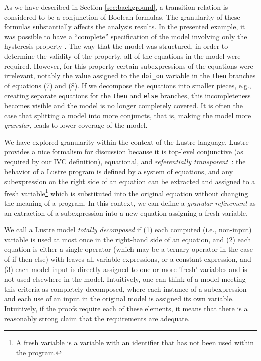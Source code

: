 As we have described in Section \ref{sec:background}, a transition relation is considered
to be a conjunction of Boolean formulas. The granularity of these formulas substantially affects the analysis results.  In the presented example, it was possible to have a ``complete'' specification of the model involving only the hysteresis property \hystp.  The way that the model was structured, in order to determine the validity of the property, all of the equations in the model were required.  However, for this property certain subexpressions of the equations were irrelevant, notably the value assigned to the \texttt{doi\_on} variable in the \texttt{then} branches of equations (7) and (8).  If we decompose the equations into smaller pieces, e.g., creating separate equations for the \texttt{then} and \texttt{else} branches, this incompleteness becomes visible and the model is no longer completely covered.  It is often the case that splitting a model into more conjuncts, that is, making the model more {\em granular}, leads to lower coverage of the model.



%
We have explored granularity within the context of the Lustre language.  Lustre provides a nice formalism for discussion because it is top-level conjunctive (as required by our IVC definition), equational, and {\em referentially transparent}~\cite{Halbwachs91:lustre}: the behavior of a Lustre program is defined by a system of equations, and any subexpression on the right side of an equation can be extracted and assigned to a fresh variable\footnote{A fresh variable is a variable with an identifier that has not been used within the program.} which is substituted into the original equation without changing the meaning of a program.  In this context, we can define a {\em granular refinement} as an extraction of a subexpression into a new equation assigning a fresh variable.

We call a Lustre model {\em totally decomposed} if (1) each computed (i.e., non-input) variable is used at most once in the right-hand side of an equation, and (2) each equation is either a single operator (which may be a ternary operator in the case of if-then-else) with leaves all variable expressions, or a constant expression, and (3) each model input is directly assigned to one or more 'fresh' variables and is not used elsewhere in the model.  Intuitively, one can think of a model meeting this criteria as completely decomposed, where each instance of a subexpression and each use of an input in the original model is assigned its own variable.  Intuitively, if the proofs require each of these elements, it means that there is a reasonably strong claim that the requirements are adequate.

